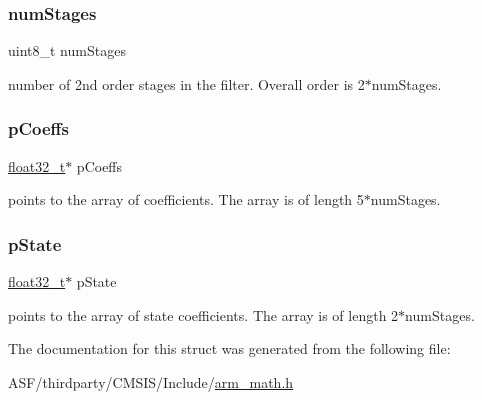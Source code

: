 \subsubsection{\texorpdfstring{numStages}{numStages}}
{\footnotesize\ttfamily uint8\+\_\+t num\+Stages}

number of 2nd order stages in the filter. Overall order is 2$\ast$num\+Stages. \mbox{\label{structarm__biquad__cascade__df2_t__instance__f32_aacbb8dd8eeba4b21fc2bb40076405ee3}} 
\subsubsection{\texorpdfstring{pCoeffs}{pCoeffs}}
{\footnotesize\ttfamily \mbox{\hyperlink{arm__math_8h_a4611b605e45ab401f02cab15c5e38715}{float32\+\_\+t}}$\ast$ p\+Coeffs}

points to the array of coefficients. The array is of length 5$\ast$num\+Stages. \mbox{\label{structarm__biquad__cascade__df2_t__instance__f32_a335c87e6fdc4b96601d95a5de8b9c463}} 
\subsubsection{\texorpdfstring{pState}{pState}}
{\footnotesize\ttfamily \mbox{\hyperlink{arm__math_8h_a4611b605e45ab401f02cab15c5e38715}{float32\+\_\+t}}$\ast$ p\+State}

points to the array of state coefficients. The array is of length 2$\ast$num\+Stages. 

The documentation for this struct was generated from the following file\+:\begin{DoxyCompactItemize}
\item 
A\+S\+F/thirdparty/\+C\+M\+S\+I\+S/\+Include/\mbox{\hyperlink{arm__math_8h}{arm\+\_\+math.\+h}}\end{DoxyCompactItemize}
